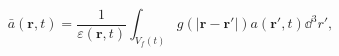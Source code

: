 \begin{equation}
\bar{a}(\mathbf{r},t) = 
\frac{1}{\varepsilon(\mathbf{r},t)} \int_{V_f(t)}{
g(|\mathbf{r} - \mathbf{r'}| ) a(\mathbf{r'},t) \dd^3 r'},
 \label{eq:a}
\end{equation}

